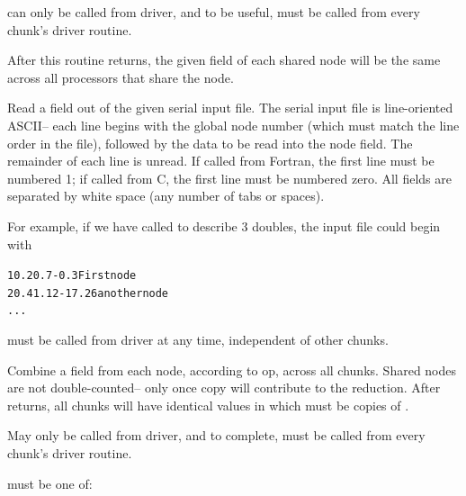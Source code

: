 \documentclass[10pt]{article}
\begin{document}
      can only be called from driver, and to be useful,
     must be called from every chunk's driver routine.

     After this routine returns, the given field of each shared node
     will be the same across all processors that share the node.


     Read a field out of the given serial input file.  The serial input
     file is line-oriented ASCII-- each line begins with the global
     node number (which must match the line order in the file),
     followed by the data to be read into the node field.  The
     remainder of each line is unread.  If called from Fortran, the
     first line must be numbered 1; if called from C, the first line
     must be numbered zero.  All fields are separated by white space
     (any number of tabs or spaces).

     For example, if we have called  to describe 3 doubles,
     the input file could begin with

\begin{alltt}
          1    0.2    0.7    -0.3      First node
          2    0.4    1.12   -17.26    another node
          ...
\end{alltt}

      must be called from driver at any time, independent
     of other chunks.


     Combine a field from each node, according to op, across all chunks.
Shared nodes are not double-counted-- only once copy will contribute to the
reduction.  After  returns, all chunks will have identical
values in  which must be  copies of .

     May only be called from driver, and to complete, must be called
     from every chunk's driver routine.

      must be one of:
\end{document}
